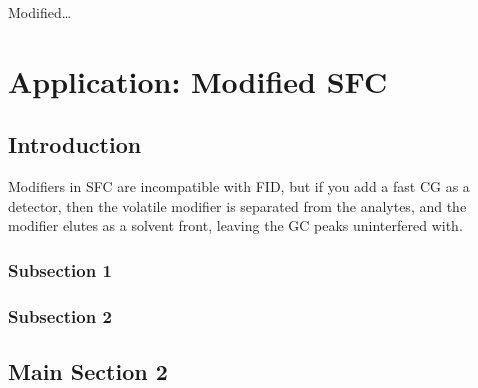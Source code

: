 
\begin{savequote}[45mm]
Modified\ldots
{}
\end{savequote}

\chapter{Application: Modified SFC} %

\label{Chapter7} %


\section{Introduction}

Modifiers in SFC are incompatible with FID, but if you add a fast CG as a
detector, then the volatile modifier is separated from the analytes, and the
modifier elutes as a solvent front, leaving the GC peaks uninterfered with.


\subsection{Subsection 1}



\subsection{Subsection 2}


\section{Main Section 2}
